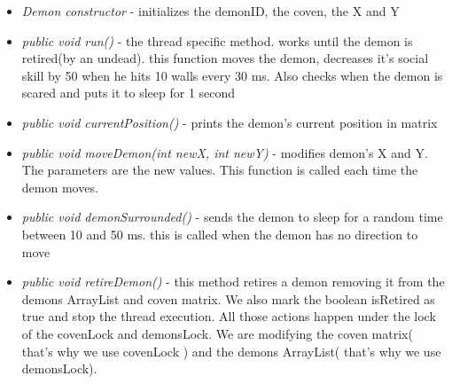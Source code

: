 \documentclass[14pt]{article}
\begin{document}
\begin{itemize}
           \item \textit{Demon constructor} - initializes the demonID, the coven, the X and Y
           \item \textit{public void run()} - the thread specific method. works until the demon is retired(by an undead). this function moves the demon, decreases it's social skill by 50 when he hits 10 walls every 30 ms. Also checks when the demon is scared and puts it to sleep for 1 second
           \item \textit{public void currentPosition()} - prints the demon's current position in matrix
           \item \textit{public void moveDemon(int newX, int newY)} - modifies demon's X and Y. The parameters are the new values. This function is called each time the demon moves.
           \item \textit{public void demonSurrounded()} - sends the demon to sleep for a random time between 10 and 50 ms. this is called when the demon has no direction to move
           \item \textit{public void retireDemon()} - this method retires a demon removing it from the demons ArrayList and coven matrix. We also mark the boolean isRetired as true and stop the thread execution. All those actions happen under the lock of the covenLock and demonsLock. We are modifying the coven matrix( that's why we use covenLock ) and the demons ArrayList( that's why we use demonsLock).
\end{itemize}
\end{document}
